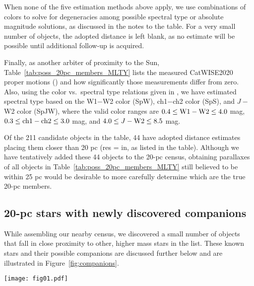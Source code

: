 \documentclass[twocolumn,tighten,twocolappendix]{aastex631}
\begin{document}
When none of the five estimation methods above apply, we use combinations of colors to solve for degeneracies among possible spectral type or absolute magnitude solutions, as discussed in the notes to the table. For a very small number of objects, the adopted distance is left blank, as no estimate will be possible until additional follow-up is acquired. 

Finally, as another arbiter of proximity to the Sun, Table~\ref{tab:poss_20pc_members_MLTY} lists the measured CatWISE2020 proper motions (\citealt{marocco2021, eisenhardt2020}) and how significantly those measurements differ from zero. Also, using the color vs.\ spectral type relations given in \cite{kirkpatrick2021}, we have estimated spectral type based on the W1$-$W2 color (SpW), ch1$-$ch2 color (SpS), and $J-$W2 color (SpJW), where the valid color ranges are $0.4 \le {\rm W1}-{\rm W2} \le 4.0$ mag, $0.3 \le {\rm ch1}-{\rm ch2} \le 3.0$ mag, and $4.0 \le J-{\rm W2} \le 8.5$ mag.

Of the 211 candidate objects in the table, 44 have adopted distance estimates placing them closer than 20 pc (res = in, as listed in the table). Although we have tentatively added these 44 objects to the 20-pc census, obtaining parallaxes of all objects in Table~\ref{tab:poss_20pc_members_MLTY} still believed to be within 25 pc would be desirable to more carefully determine which are the true 20-pc members.

\subsection{20-pc stars with newly discovered companions\label{sec:new_companions}}

While assembling our nearby census, we discovered a small number of objects that fall in close proximity to other, higher mass stars in the list. These known stars and their possible companions are discussed further below and are illustrated in Figure~\ref{fig:companions}.

\begin{figure*}
\texttt{[image: fig01.pdf]}
\caption{Images illustrating the six new multiple systems discussed in the text. Each image has north up and east to the left, and the size of each (in arcsec) is noted in the legend. (a) HD 13579 and CWISER J021550.96+674017.2, (b) HD 17230 and Gaia DR3 25488745411919488, (c) G 43-23 and WISEU J100241.49+145914.9, (d) HD 170573 and CWISE J183207.94$-$540943.3, (e) G 155-42 and CWISE J184803.45$-$143232.3, and (f) 2MASS J19253089+0938235 A and B. All panels show WISE W1+W2 images from WiseView, except for panel (b), which shows a Keck/NIRC2 $K_p$-band image, and panel (f), which shows a Keck/NIRC2 $K$-band image.
\label{fig:companions}}
\end{figure*}
\end{document}
